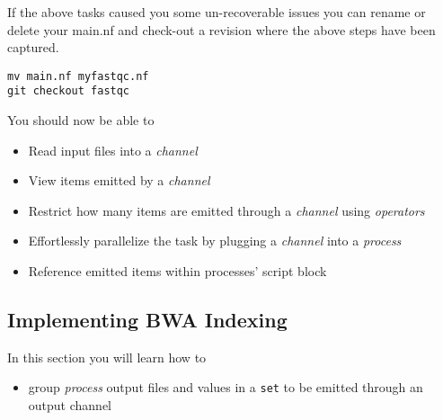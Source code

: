 \begin{note}
If the above tasks caused you some un-recoverable issues you can rename or delete your main.nf and check-out a revision where the above steps have been captured.
\begin{lstlisting}
mv main.nf myfastqc.nf
git checkout fastqc
\end{lstlisting}
\end{note}

You should now be able to 

\begin{itemize}
 \item Read input files into a \emph{channel}
 \item View items emitted by a \emph{channel}
 \item Restrict how many items are emitted through a \emph{channel} using \emph{operators}
 \item Effortlessly parallelize the task by plugging a \emph{channel} into a \emph{process}
 \item Reference emitted items within processes' script block
\end{itemize}

%
\subsection{Implementing BWA Indexing}


In this section you will learn how to

\begin{itemize}
 \item  group \emph{process} output files and values in a \texttt{set} to be emitted through an output channel
\end{itemize}


